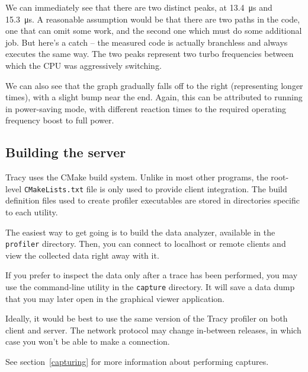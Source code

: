 \documentclass[hidelinks,titlepage,a4paper,twoside]{article}
\begin{document}
We can immediately see that there are two distinct peaks, at 13.4~\si{\micro\second} and 15.3~\si{\micro\second}. A reasonable assumption would be that there are two paths in the code, one that can omit some work, and the second one which must do some additional job. But here's a catch -- the measured code is actually branchless and always executes the same way. The two peaks represent two turbo frequencies between which the CPU was aggressively switching.

We can also see that the graph gradually falls off to the right (representing longer times), with a slight bump near the end. Again, this can be attributed to running in power-saving mode, with different reaction times to the required operating frequency boost to full power.

\subsection{Building the server}
\label{buildingserver}

Tracy uses the CMake build system. Unlike in most other programs, the root-level \texttt{CMakeLists.txt} file is only used to provide client integration. The build definition files used to create profiler executables are stored in directories specific to each utility.

The easiest way to get going is to build the data analyzer, available in the \texttt{profiler} directory. Then, you can connect to localhost or remote clients and view the collected data right away with it.

If you prefer to inspect the data only after a trace has been performed, you may use the command-line utility in the \texttt{capture} directory. It will save a data dump that you may later open in the graphical viewer application.

Ideally, it would be best to use the same version of the Tracy profiler on both client and server. The network protocol may change in-between releases, in which case you won't be able to make a connection.

See section~\ref{capturing} for more information about performing captures.
\end{document}
